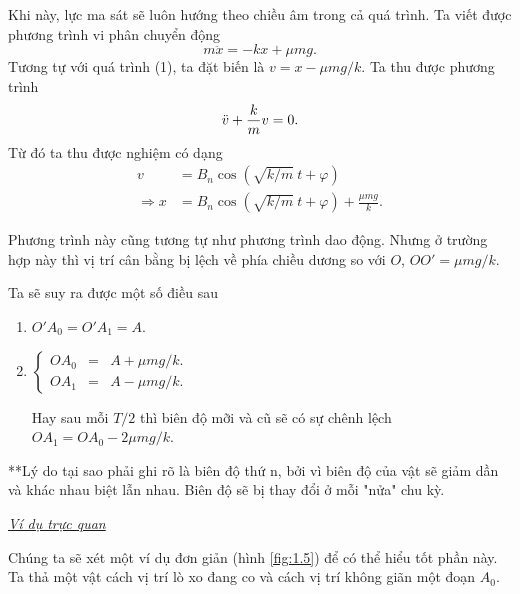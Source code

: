 Khi này, lực ma sát sẽ luôn hướng theo chiều âm trong cả quá trình. Ta viết được phương trình vi phân chuyển động
\begin{equation}
    m \ddot{x} =  - kx + \mu m g.
    \label{eq:1.6}
\end{equation}
Tương tự với quá trình (1), ta đặt biến là $v = x - \mu mg/k$. Ta thu được phương trình
\begin{equation*}
    \ddot{v} + {\frac{k}{m} \displaystyle} v = 0.
\end{equation*}
Từ đó ta thu được nghiệm có dạng
\begin{equation}
    \begin{split}
        v &= B_n \cos{\left(\sqrt{k/m} \ t + \varphi \right)} \\
        \Rightarrow x &=  B_n \cos{\left(\sqrt{k/m} \ t + \varphi \right)} + {\displaystyle \frac{\mu m g}{k}}.
    \end{split}
    \label{eq:1.7}
\end{equation}

Phương trình này cũng tương tự như phương trình dao động. Nhưng ở trường hợp này thì vị trí cân bằng bị lệch về phía chiều dương so với $O$, $OO' = \mu mg/k$. 

\begin{figure}[!htb]
    \centering
    
    \caption{}
    \label{fig:1.4}
\end{figure}

Ta sẽ suy ra được một số điều sau
\begin{enumerate}
    \item \(O'A_0 = O'A_1 = A\).
    \item 
    \(
    \left\{
        \begin{array}{ccc}
        OA_0 &=& A + \mu mg/k. \\ 
        OA_1 &=& A - \mu mg/k.
        \end{array}
    \right.
    \) 

    Hay sau mỗi \(T/2\) thì biên độ mỡi và cũ sẽ có sự chênh lệch
    \(OA_1 = OA_0 - 2 \mu mg/k\).
\end{enumerate}

**Lý do tại sao phải ghi rõ là biên độ thứ n, bởi vì biên độ của vật sẽ giảm dần và khác nhau biệt lẫn nhau. Biên độ sẽ bị thay đổi ở mỗi "nửa" chu kỳ. 
\vspace{2mm}

\underline{\textit{Ví dụ trực quan}}

Chúng ta sẽ xét một ví dụ đơn giản (hình \ref{fig:1.5}) để có thể hiểu tốt phần này. Ta thả một vật cách vị trí lò xo đang co và cách vị trí không giãn một đoạn $A_0$.
\vspace{2mm}

